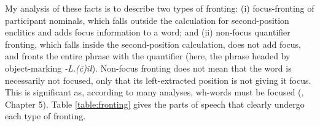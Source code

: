 \begin{comment}
This same pattern with respect to \textit{ʔuuš} is present in Sapir's original data.\footnotemark{} \textit{ʔuušił}, which is \textit{ʔuuš} `some' with the object marking \textit{-L.(č)ił} attached, behaves the same way in my data. \textit{ʔuušił} may be fronted without the second-position enclitics, as already seen in (\ref{ex:uushilfront}), or it may then take the enclitics, as in (\ref{ex:uushilfrontclitic}) below. I could not find any \textit{ʔuušił} fronting in the Sapir-Thomas texts, so \textit{ʔuušił} fronting may represent a change in the language in the intervening generations.

\footnotetext{\noindent With the clitic complex:

\ex~ \label{ex:uushfrontcliticNT}
\begingl
\glpreamble ʔuušʔaƛ maqw̓in. //
\gla ʔuuš=!aƛ maq-w̓in  //
\glb some=\textsc{now} tie-middle //
\glft `Some are tied about the middle.' \citep[p.~70]{sapir1955} //
\endgl
\xe

\noindent Without the clitic complex:

\ex~ \label{ex:uushfrontnocliticNT}
\begingl
\glpreamble ʔuuš saac̓inłšiʔaƛƛaa ʔaḥʔaa ƛ̓acʔii ƛ̓isitʔi sac̓up. //
\gla ʔuuš saac̓inł-šiƛ=!aƛ=ƛaa ʔaḥʔaa ƛ̓ac=ʔiˑ ƛ̓isit=ʔiˑ sac̓up  //
\glb some seafood.feast(?)-\textsc{mo}=\textsc{now}=also \textsc{dtop} fat=\textsc{art} white=\textsc{art} spring.salmon //
\glft `Some would start feasting with the fat, white-bodied tyee salmon.' \citep[p.~22]{sapir1955} //
\endgl
\xe
}

\ex \label{ex:uushilfrontclitic}
\begingl
\glpreamble ʔuušiłqaˑč̓a n̓aacsa. //
\gla ʔuuš-L.(č)ił=qaˑč̓a n̓aacsa  //
\glb some-\textsc{do.to}=\textsc{infr.3} see.\textsc{cv} //
\glft `He must've seen something.' (\textbf{C}, \textit{tupaat} Julia Lucas) //
\endgl
\xe

I have no examples of the strong quantifier \textit{hišuk} `all' fronting without the second-position complex, and it is possibly ungrammatical. The version of the strong quantifier in the Sapir-Thomas texts, \textit{č̓uučk}, does not occur in a fronting environment where the enclitics unambiguously fall on the following predicate. (That is, in a case where the enclitic could not be a singly null-marked third person morpheme.)
\end{comment}

My analysis of these facts is to describe two types of fronting: (i) focus-fronting of participant nominals, which falls outside the calculation for second-position enclitics and adds focus information to a word; and (ii) non-focus quantifier fronting, which falls inside the second-position calculation, does not add focus, and fronts the entire phrase with the quantifier (here, the phrase headed by object-marking \textit{-L.(č)ił}). Non-focus fronting does not mean that the word is necessarily not focused, only that its left-extracted position is not giving it focus. This is significant as, according to many analyses, wh-words must be focused (\citet{lambrecht1996}, Chapter 5). Table \ref{table:fronting} gives the parts of speech that clearly undergo each type of fronting.

